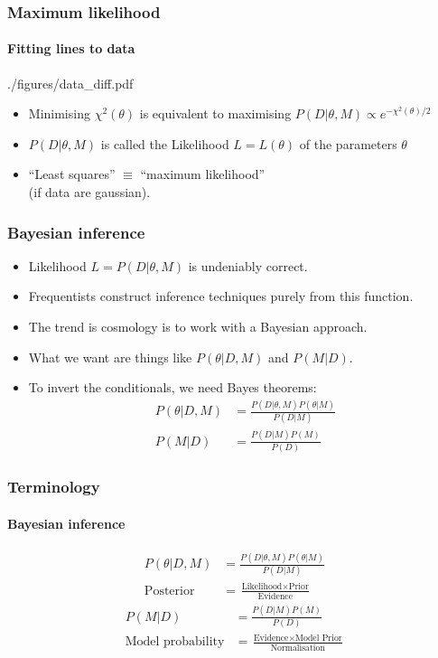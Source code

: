 \documentclass[%
]{beamer}
\begin{document}
\begin{frame}
    \frametitle{Maximum likelihood}
    \framesubtitle{Fitting lines to data}
    \begin{figleft}[0.6]{./figures/data_diff.pdf}
        \begin{itemize}
            \item Minimising $\chi^2(\theta)$  is equivalent to maximising $P(D|\theta,M) \propto e^{-\chi^2(\theta)/2}$
            \item $P(D|\theta,M)$ is called the Likelihood $L=L(\theta)$ of the parameters $\theta$
            \item ``Least squares'' $\equiv$ ``maximum likelihood'' \\(if data are gaussian).
        \end{itemize}
    \end{figleft}
\end{frame}

\begin{frame}
    \frametitle{Bayesian inference}
    \begin{itemize}
        \item Likelihood $L=P(D|\theta,M)$ is undeniably correct.
        \item Frequentists construct inference techniques purely from this function.
        \item The trend is cosmology is to work with a Bayesian approach.
        \item What we want are things like $P(\theta|D,M)$ and $P(M|D)$.
        \item To invert the conditionals, we need Bayes theorems:
            \begin{align}
                P(\theta|D,M) &= \frac{P(D|\theta,M) P(\theta|M)}{P(D|M)} \nonumber\\
                P(M|D) &= \frac{P(D|M) P(M)}{P(D)} \nonumber
            \end{align}
    \end{itemize}
\end{frame}

\begin{frame}
    \frametitle{Terminology}
    \framesubtitle{Bayesian inference}
    \begin{align}
        P(\theta|D,M) &= \frac{P(D|\theta,M) P(\theta|M)}{P(D|M)} \nonumber\\
        \text{Posterior} &= \frac{\text{Likelihood}\times\text{Prior}}{\text{Evidence}} \nonumber
    \end{align}
    \begin{align}
        P(M|D) &= \frac{P(D|M) P(M)}{P(D)} \nonumber\\
        \text{Model probability} &= \frac{\text{Evidence}\times\text{Model Prior}}{\text{Normalisation}} \nonumber
    \end{align}
\end{frame}
\end{document}
